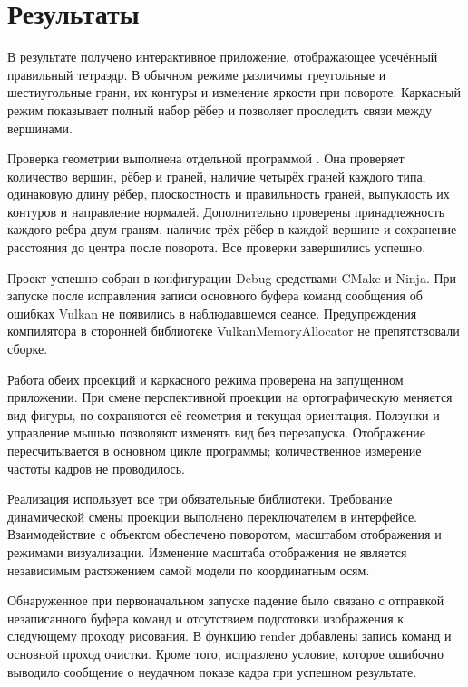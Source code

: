 \section{Результаты}

В результате получено интерактивное приложение, отображающее усечённый правильный тетраэдр. В обычном режиме различимы треугольные и шестиугольные грани, их контуры и изменение яркости при повороте. Каркасный режим показывает полный набор рёбер и позволяет проследить связи между вершинами.

Проверка геометрии выполнена отдельной программой . Она проверяет количество вершин, рёбер и граней, наличие четырёх граней каждого типа, одинаковую длину рёбер, плоскостность и правильность граней, выпуклость их контуров и направление нормалей. Дополнительно проверены принадлежность каждого ребра двум граням, наличие трёх рёбер в каждой вершине и сохранение расстояния до центра после поворота. Все проверки завершились успешно.

Проект успешно собран в конфигурации Debug средствами CMake и Ninja. При запуске после исправления записи основного буфера команд сообщения об ошибках Vulkan не появились в наблюдавшемся сеансе. Предупреждения компилятора в сторонней библиотеке VulkanMemoryAllocator не препятствовали сборке.

Работа обеих проекций и каркасного режима проверена на запущенном приложении. При смене перспективной проекции на ортографическую меняется вид фигуры, но сохраняются её геометрия и текущая ориентация. Ползунки и управление мышью позволяют изменять вид без перезапуска. Отображение пересчитывается в основном цикле программы; количественное измерение частоты кадров не проводилось.

Реализация использует все три обязательные библиотеки. Требование динамической смены проекции выполнено переключателем в интерфейсе. Взаимодействие с объектом обеспечено поворотом, масштабом отображения и режимами визуализации. Изменение масштаба отображения не является независимым растяжением самой модели по координатным осям.

Обнаруженное при первоначальном запуске падение было связано с отправкой незаписанного буфера команд и отсутствием подготовки изображения к следующему проходу рисования. В функцию render добавлены запись команд и основной проход очистки. Кроме того, исправлено условие, которое ошибочно выводило сообщение о неудачном показе кадра при успешном результате.


